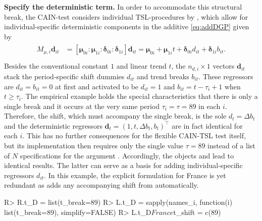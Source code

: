\textbf{Specify the deterministic term.} In order to accommodate this structural break, the CAIN-test considers individual TSL-procedures by \citet{TrenklerEtAl2008}, which allow for individual-specific deterministic components in the additive \eqref{eq:addDGP} given by
\begin{align} \label{eq:detTerm}
\begin{split}
	M_{\mu,i} \boldsymbol{d}_{it} & = \left[ \boldsymbol{\mu}_{0i} : \boldsymbol{\mu}_{1i} : \boldsymbol{\delta}_{0i} : \boldsymbol{\delta}_{1i} \right] \boldsymbol{d}_{it}	= \boldsymbol{\mu}_{0i} + \boldsymbol{\mu}_{1i}t + \boldsymbol{\delta}_{0i} d_{it} + \boldsymbol{\delta}_{1i} b_{it}. \\
\end{split}
\end{align}
Besides the conventional constant $ 1 $ and linear trend $ t $, the $ n_{d,i} \times 1 $ vectors $ \boldsymbol{d}_{it} $ stack the period-specific shift dummies $ d_{it} $ and trend breaks $ b_{it} $. These regressors are $ d_{it} = b_{it} = 0 $ at first and activated to be $ d_{it} = 1 $ and $ b_{it} = t -\tau_i +1 $ when $ t \geq \tau_i $. The empirical example holds the special characteristics that there is only a single break and it occurs at the very same period $ \tau_i = \tau = 89 $ in each $ i $. Therefore, the shift, which must accompany the single break, is the sole $ d_{t} = \Delta b_t $ and the deterministic regressors $ \boldsymbol{d}_{t} = \left( 1, t, \Delta b_t, b_t \right)^\top $ are in fact identical for each $ i $. This has no further consequences for the flexible CAIN-TSL test itself, but its implementation  then requires only the single value $ \tau=89 $ instead of a list of $ N $ specifications for the argument . Accordingly, the objects  and  lead to identical results. The latter can serve as a basis for adding individual-specific regressors $ d_{it} $. In this example, the explicit formulation for France is yet redundant as  adds any accompanying shift from  automatically.
\begin{CodeChunk}
\begin{CodeInput}
R> R.t_D = list(t_break=89)
R> L.t_D = sapply(names_i, function(i) list(t_break=89), simplify=FALSE)
R> L.t_D$France$t_shift = c(89)
\end{CodeInput}
\end{CodeChunk}

